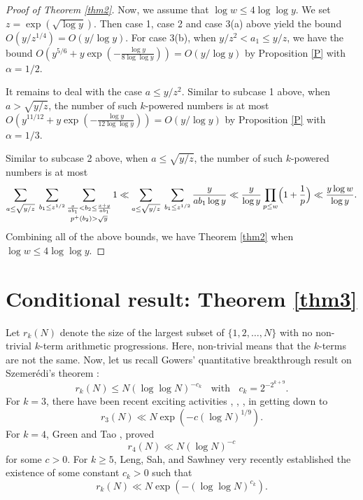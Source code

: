 \documentclass[12pt]{article}
\begin{document}
\begin{proof}[Proof of Theorem \ref{thm2}]
\bigskip

Now, we assume that $\log w \le 4 \log \log y$. We set $z = \exp(\sqrt{\log y})$. Then case 1, case 2 and case 3(a) above yield the bound $O(y / z^{1/4}) = O(y / \log y)$. For case 3(b), when $y /z^2 < a_1 \le y / z$, we have the bound $O(y^{5/6} + y \exp(- \frac{\log y}{8 \log \log y})) = O( y / \log y )$ by Proposition \ref{P} with $\alpha = 1/2$. 

\bigskip

It remains to deal with the case $a \le y / z^2$. Similar to subcase 1 above, when $a > \sqrt{y / z}$, the number of such $k$-powered numbers is at most $O(y^{11/12} + y \exp(- \frac{\log y}{12 \log \log y})) = O( y / \log y )$ by Proposition \ref{P} with $\alpha = 1/3$.

\bigskip

Similar to subcase 2 above, when $a \le \sqrt{y / z}$, the number of such $k$-powered numbers is at most
\[
\sum_{a \le \sqrt{y/z}} \; \sum_{b_1 \le z^{1/2}} \mathop{\sum_{\frac{x}{a b_1} < b_2 \le \frac{x + y}{a b_1}}}_{p^+(b_2) > \sqrt{y}} 1 \ll \sum_{a \le \sqrt{y/z}} \; \sum_{b_1 \le z^{1/2}} \frac{y}{a b_1 \log y} \ll \frac{y}{\log y} \prod_{p \le w} \Bigl(1 + \frac{1}{p} \Bigr) \ll \frac{y \log w}{\log y}.
\]
Combining all of the above bounds, we have Theorem \ref{thm2} when $\log w \le 4 \log \log y$.
\end{proof}

\section{Conditional result: Theorem \ref{thm3}}

Let $r_k(N)$ denote the size of the largest subset of $\{1, 2, \ldots, N \}$ with no non-trivial $k$-term arithmetic progressions. Here, non-trivial means that the $k$-terms are not the same. Now, let us recall Gowers' quantitative breakthrough result on Szemer\'{e}di's theorem \cite{G:2001}:
\[
r_k(N) \le N (\log \log N)^{-c_k} \; \; \text{ with } \; \; c_k = 2^{-2^{k+9}}.
\]
For $k = 3$, there have been recent exciting activities \cite{BS:2020}, \cite{KM:2023}, \cite{BS:2023a}, \cite{BS:2023b} in getting down to
\[
r_3(N) \ll N \exp( - c (\log N)^{1/9}).
\]
For $k = 4$, Green and Tao \cite{GT:2009}, \cite{GT:2017} proved
\[
r_4(N) \ll N (\log N)^{-c}
\]
for some $c > 0$. For $k \ge 5$, Leng, Sah, and Sawhney \cite{LSS:2024} very recently established the existence of some constant $c_k > 0$ such that
\begin{equation} \label{lss}
r_k(N) \ll N \exp (- (\log \log N)^{c_k} ).
\end{equation}
\end{document}
